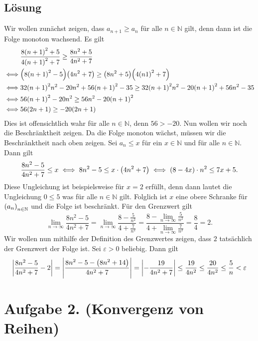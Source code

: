 \documentclass[german,12pt]{homework}
\newcommand{\NN}{\mathbb{N}}
\DeclarePairedDelimiter{\absolute}{\lvert}{\rvert}
\DeclarePairedDelimiter{\enbrace}{(}{)}
\begin{document}
    \subsection*{Lösung} Wir wollen zunächst zeigen, dass \(a_{n + 1} \ge a_n\) für alle \(n \in \NN\) gilt, denn dann ist die Folge monoton wachsend. Es gilt
    \begin{align*}
        &\frac{8\enbrace*{n + 1}^2 + 5}{4\enbrace*{n + 1}^2 + 7} \ge \frac{8n^2 + 5}{4n^2 + 7}\\ \iff &\enbrace*{8\enbrace*{n + 1}^2 - 5}\enbrace*{4n^2 + 7} \ge \enbrace*{8n^2 + 5}\enbrace*{4\enbrace*{n  1}^2 + 7}\\
        \iff &32\enbrace*{n + 1}^2n^2 - 20n^2 + 56\enbrace*{n + 1}^2 - 35 \ge 32\enbrace*{n + 1}^2n^2 - 20\enbrace*{n + 1}^2 + 56n^2 - 35\\
        \iff &56\enbrace*{n + 1}^2 - 20n^2 \ge 56n^2 - 20\enbrace*{n + 1}^2\\
        \iff &56\enbrace*{2n + 1} \ge -20\enbrace*{2n + 1}
    \end{align*}
    Dies ist offensichtlich wahr für alle \(n \in \NN\), denn \(56 > -20\). Nun wollen wir noch die Beschränktheit zeigen. Da die Folge monoton wächst, müssen wir die Beschränktheit nach oben zeigen. Sei \(a_n \le x\) für ein \(x \in \NN\) und für alle \(n \in \NN\). Dann gilt
    \[\frac{8n^2 - 5}{4n^2 + 7} \le x \iff 8n^2 - 5 \le x \cdot \enbrace*{4n^2 + 7} \iff \enbrace*{8 - 4x} \cdot n^2 \le 7x + 5.\]
    Diese Ungleichung ist beispielsweise für \(x = 2\) erfüllt, denn dann lautet die Ungleichung \(0 \le 5\) was für alle \(n \in \NN\) gilt. Folglich ist \(x\) eine obere Schranke für \(\enbrace*{a_n}_{n \in \NN}\) und die Folge ist beschränkt. Für den Grenzwert gilt
    \[\lim_{n \to \infty}\frac{8n^2 - 5}{4n^2 + 7} = \lim_{n \to \infty}\frac{8 - \frac{5}{n^2}}{4 + \frac{7}{n^2}} = \frac{8 - \lim_{n \to \infty}\frac{5}{n^2}}{4 + \lim_{n \to \infty}\frac{7}{n^2}} = \frac{8}{4} = 2.\]
    Wir wollen nun mithilfe der Definition des Grenzwertes zeigen, dass \(2\) tatsächlich der Grenzwert der Folge ist. Sei \(\varepsilon > 0\) beliebig. Dann gilt
    \begin{align*}
        \absolute*{\frac{8n^2 - 5}{4n^2 + 7} - 2} = \absolute*{\frac{8n^2 - 5 - \enbrace*{8n^2 + 14}}{4n^2 + 7}} = \absolute*{-\frac{19}{4n^2 + 7}} \le \frac{19}{4n^2} \le \frac{20}{4n^2} \le \frac{5}{n} < \varepsilon
    \end{align*}

    \section*{Aufgabe 2. (Konvergenz von Reihen)}
\end{document}
